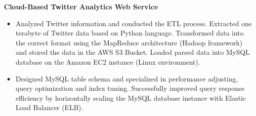 \documentclass[10pt]{article} %
\begin{document}
{\begin{minipage}[t]{0.47\textwidth}





{\raggedright\normalsize \textbf{Cloud-Based Twitter Analytics Web Service}} %

\begin{itemize}[leftmargin=*, topsep=1pt, partopsep=1.5pt]
\setlength\itemsep{1pt}
\item Analyzed Twitter information and conducted the ETL process. Extracted one terabyte of Twitter data based on Python language. Transformed data into the correct format using the MapReduce architecture (Hadoop framework) and stored the data in the AWS S3 Bucket. Loaded parsed data into MySQL database on the Amazon EC2 instance (Linux environment).
\item Designed MySQL table schema and specialized in performance adjusting, query optimization and index tuning. Successfully improved query response efficiency by horizontally scaling the MySQL database instance with Elastic Load Balancer (ELB).\\[0.01\baselineskip]
\end{itemize}






\end{minipage}}
\end{document}
